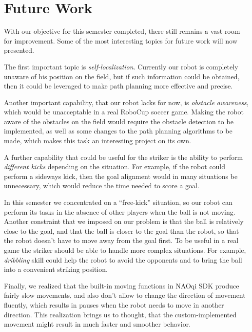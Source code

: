 \section{Future Work}

With our objective for this semester completed, there still remains a vast room
for improvement. Some of the most interesting topics for future work will now
presented.

The first important topic is \textit{self-localization}. Currently our robot is
completely unaware of his position on the field, but if such information could
be obtained, then it could be leveraged to make path planning more effective
and precise.

Another important capability, that our robot lacks for now, is \textit{obstacle
  awareness}, which would be unacceptable in a real RoboCup soccer game. Making
the robot aware of the obstacles on the field would require the obstacle
detection to be implemented, as well as some changes to the path planning
algorithms to be made, which makes this task an interesting project on its own.

A further capability that could be useful for the striker is the ability to
perform \textit{different kicks} depending on the situation. For example, if
the robot could perform a sideways kick, then the goal alignment would in many
situations be unnecessary, which would reduce the time needed to score a goal.

In this semester we concentrated on a ``free-kick'' situation, so our robot can
perform its tasks in the absence of other players when the ball is not moving.
Another constraint that we imposed on our problem is that the ball is
relatively close to the goal, and that the ball is closer to the goal than the
robot, so that the robot doesn't have to move away from the goal first. To be
useful in a real game the striker should be able to handle more complex
situations. For example, \textit{dribbling} skill could help the robot to avoid
the opponents and to bring the ball into a convenient striking position.

Finally, we realized that the built-in moving functions in NAOqi SDK produce
fairly slow movements, and also don't allow to change the direction of movement
fluently, which results in pauses when the robot needs to move in another
direction. This realization brings us to thought, that the custom-implemented
movement might result in much faster and smoother behavior.

